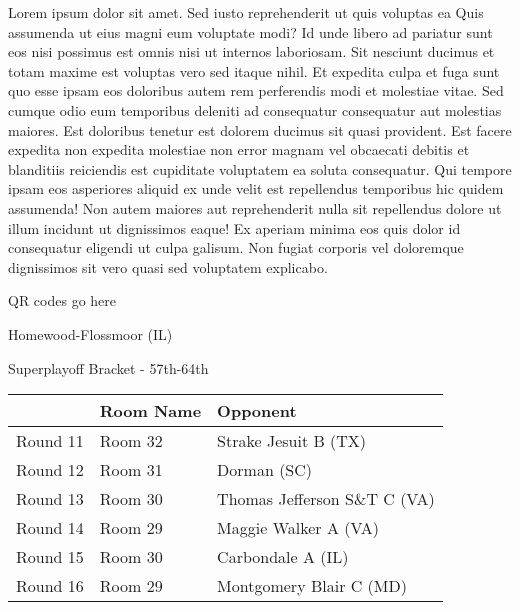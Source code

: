 \documentclass{article}%
\begin{document}
\vspace*{8pt}%
\linebreak%
\newline%
\newline%
    Lorem ipsum dolor sit amet. Sed iusto reprehenderit ut quis voluptas ea Quis assumenda ut eius magni eum voluptate modi? Id unde libero ad pariatur sunt eos nisi possimus est omnis nisi ut internos laboriosam. Sit nesciunt ducimus et totam maxime est voluptas vero sed itaque nihil. Et expedita culpa et fuga sunt quo esse ipsam eos doloribus autem rem perferendis modi et molestiae vitae.\newline%
\newline%
    Sed cumque odio eum temporibus deleniti ad consequatur consequatur aut molestias maiores. Est doloribus tenetur est dolorem ducimus sit quasi provident. Est facere expedita non expedita molestiae non error magnam vel obcaecati debitis et blanditiis reiciendis est cupiditate voluptatem ea soluta consequatur. Qui tempore ipsam eos asperiores aliquid ex unde velit est repellendus temporibus hic quidem assumenda!\newline%
\newline%
    Non autem maiores aut reprehenderit nulla sit repellendus dolore ut illum incidunt ut dignissimos eaque! Ex aperiam minima eos quis dolor id consequatur eligendi ut culpa galisum. Non fugiat corporis vel doloremque dignissimos sit vero quasi sed voluptatem explicabo.\newline%
\newline%
\vspace*{30pt}%
\begin{center}%
\begin{Huge}%
QR codes go here%
\end{Huge}%
\end{center}%
\newpage%
\begin{center}%
\begin{Huge}%
Homewood{-}Flossmoor (IL)%
\end{Huge}%
\vspace*{8pt}%
\linebreak%
\begin{Large}%
Superplayoff Bracket {-} 57th{-}64th%
\end{Large}%
\end{center}%
%
\begin{tabularx}{\textwidth}{|c|Y|Y|}%
\hline%
&Room Name&Opponent\\%
\hline%
Round 11&Room 32&Strake Jesuit B (TX)\\%
Round 12&Room 31&Dorman (SC)\\%
Round 13&Room 30&Thomas Jefferson S\&T C (VA)\\%
Round 14&Room 29&Maggie Walker A (VA)\\%
Round 15&Room 30&Carbondale A (IL)\\%
Round 16&Room 29&Montgomery Blair C (MD)\\%
\hline%
\end{tabularx}%
\end{document}
